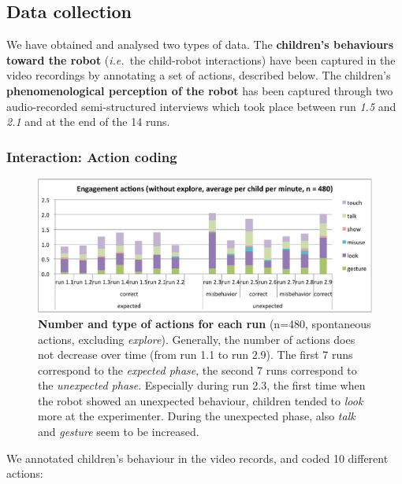 \documentclass{sig-alternate}
\newcommand{\ie}{{\textit{i.e.~}}}
\begin{document}
\subsection{Data collection}


We have obtained and analysed two types of data. The \textbf{children's
behaviours toward the robot} (\ie the child-robot interactions) have been
captured in the video recordings by annotating a set of actions, described
below. The children's \textbf{phenomenological perception of the robot} has been
captured through two audio-recorded semi-structured interviews which took place
between run \emph{1.5} and \emph{2.1} and at the end of the 14 runs.


\subsubsection{Interaction: Action coding}

\begin{figure}[ht!] 
    \centering 
    \includegraphics[width=0.9\linewidth]{domino-time-active.pdf} 
    \caption{\small \textbf{Number and type of actions for each run} (n=480,
        spontaneous actions, excluding \emph{explore}). Generally, the number of
        actions does not decrease over time (from run 1.1 to run 2.9).  The
        first 7 runs correspond to the \textit{expected phase}, the second 7
        runs correspond to the \textit{unexpected phase}. Especially during run
        2.3, the first time when the robot showed an unexpected behaviour,
        children tended to \textit{look} more at the experimenter. During the
        unexpected phase, also \textit{talk} and \textit{gesture} seem to be
        increased.}

    \label{fig:domino-time-active} 
\end{figure}

We annotated children's behaviour in the video records, and coded 10 different
actions:
\end{document}
